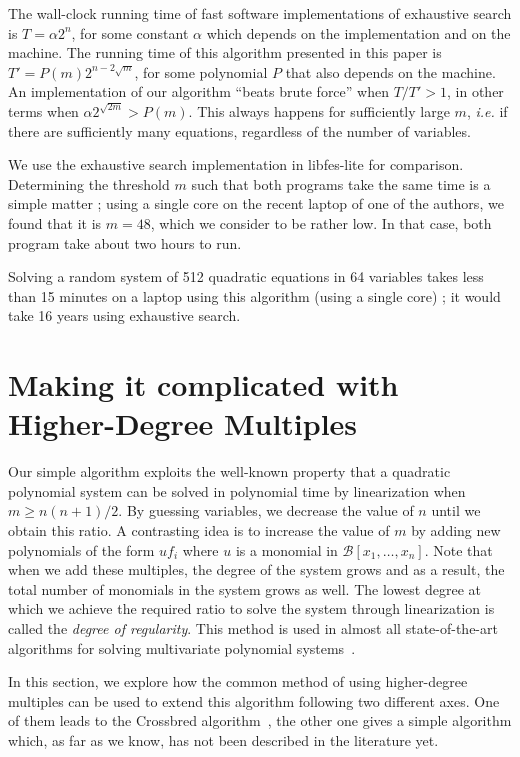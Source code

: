 \documentclass[a4paper,UKenglish,cleveref, autoref]{lipics-v2019}
\begin{document}
	The wall-clock running time of fast software implementations of exhaustive
	search is $T = \alpha 2^n$, for some constant $\alpha$ which depends on the
	implementation and on the machine. The running time of this algorithm presented
	in this paper is $T' = P(m) 2^{n - 2\sqrt{m}}$, for some polynomial $P$ that
	also depends on the machine. An implementation of our algorithm ``beats brute
	force'' when $T/T' > 1$, in other terms when
	$\alpha 2^{\sqrt{2m}} > P(m)$. This always happens for sufficiently large
	$m$, \textit{i.e.} if there are sufficiently many equations, regardless of the
	number of variables.
	
	We use the exhaustive search implementation in \textsf{libfes-lite} for
	comparison. Determining the threshold $m$ such that both programs take the same
	time is a simple matter ; using a single core on the recent laptop of one of the
	authors, we found that it is $m=48$, which we consider to be rather low. In that
	case, both program take about two hours to run.
	
	Solving a random system of 512 quadratic equations in 64 variables takes less
	than 15 minutes on a laptop using this algorithm (using a single core) ; it
	would take 16 years using exhaustive search.
	
	
	\section{Making it complicated with Higher-Degree Multiples}
	\label{sec:extensions}
	
	
	Our simple algorithm exploits the well-known property that a quadratic polynomial system can be solved in polynomial time by linearization when $m \geq n(n+1)/2$.
	By guessing variables, we decrease the value of $n$ until we obtain this ratio. A contrasting idea is to increase the value of $m$ by adding new polynomials of the form $uf_i$ where $u$ is a monomial in $\mathcal{B}[x_1, \dots, x_n]$.
	Note that when we add these multiples, the degree of the system grows and as a result, the total number of monomials in the system grows as well. The lowest degree at which we achieve the required ratio to solve the system through linearization is called the \textit{degree of regularity}. This method is used in almost all state-of-the-art algorithms for solving multivariate polynomial systems~\cite{F4,F5,CourtoisKPS00,BardetFSS13,JouxV17}. 
	
	In this section, we explore how the common method of using higher-degree multiples can be used to extend this algorithm following two different axes.
	One of them leads to the \textsf{Crossbred} algorithm~\cite{JouxV17}, the other
	one gives a simple algorithm which, as far as we know, has not been described
	in the literature yet.
	
\end{document}
